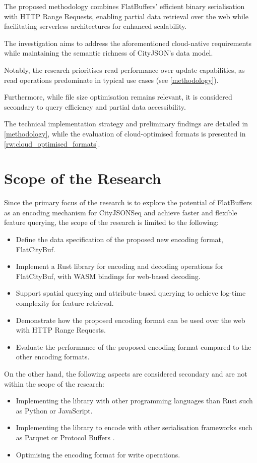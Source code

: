 The proposed methodology combines FlatBuffers' efficient binary serialisation with HTTP Range Requests, enabling partial data retrieval over the web while facilitating serverless architectures for enhanced scalability.

The investigation aims to address the aforementioned cloud-native requirements while maintaining the semantic richness of CityJSON's data model.

Notably, the research prioritises read performance over update capabilities, as read operations predominate in typical use cases (see \autoref{methodology}).

Furthermore, while file size optimisation remains relevant, it is considered secondary to query efficiency and partial data accessibility.

The technical implementation strategy and preliminary findings are detailed in \autoref{methodology}, while the evaluation of cloud-optimised formats is presented in \autoref{rw:cloud_optimised_formats}.

\section{Scope of the Research}
\label{introduction:scope_of_the_research}

Since the primary focus of the research is to explore the potential of FlatBuffers as an encoding mechanism for CityJSONSeq and achieve faster and flexible feature querying, the scope of the research is limited to the following:

\begin{itemize}
  \item Define the data specification of the proposed new encoding format, FlatCityBuf.
  \item Implement a Rust library for encoding and decoding operations for FlatCityBuf, with WASM bindings for web-based decoding.
  \item Support spatial querying and attribute-based querying to achieve log-time complexity for feature retrieval.
  \item Demonstrate how the proposed encoding format can be used over the web with HTTP Range Requests.
  \item Evaluate the performance of the proposed encoding format compared to the other encoding formats.
\end{itemize}

On the other hand, the following aspects are considered secondary and are not within the scope of the research:
\begin{itemize}
  \item Implementing the library with other programming languages than Rust such as Python or JavaScript.
  \item Implementing the library to encode with other serialisation frameworks such as Parquet \citep{parquet} or Protocol Buffers \citep{protobuf}.
  \item Optimising the encoding format for write operations.
\end{itemize}

